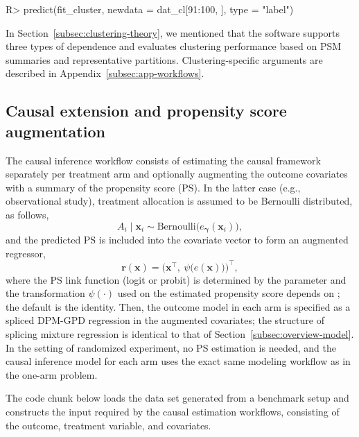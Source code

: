 \documentclass[11pt]{article}\usepackage[]{graphicx}\usepackage[]{xcolor}
\newcommand{\code}[1]{\texttt{\detokenize{#1}}}
\renewenvironment{Schunk}{\vspace{0pt}}{\vspace{-0.1\baselineskip}}
\begin{document}
\begin{Schunk}
\begin{Sinput}
R> predict(fit_cluster, newdata = dat_cl[91:100, ], type = "label")
\end{Sinput}
\end{Schunk}

In Section~\ref{subsec:clustering-theory}, we mentioned that the software supports three types of dependence and evaluates clustering performance based on PSM summaries and representative partitions.
Clustering-specific arguments are described in Appendix~\ref{subsec:app-workflows}.



\subsection{Causal extension and propensity score augmentation}
\label{subsec:overview-causal}

The causal inference workflow consists of estimating the causal
framework separately per treatment arm and optionally augmenting the
outcome covariates with a summary of the propensity score (PS). In the
latter case (e.g., observational study), treatment allocation is
assumed to be Bernoulli distributed, as follows,
\begin{equation*}
A_i \mid \boldsymbol{x}_i \sim \mathrm{Bernoulli}\big(e_{\boldsymbol{\gamma}}(\boldsymbol{x}_i)\big),
\end{equation*}
and the predicted PS is included into the covariate vector to form an
augmented regressor,
\begin{equation*}
\boldsymbol{r}(\boldsymbol{x}) = \big(\boldsymbol{x}^\top,\ \psi\big(\widehat e(\boldsymbol{x})\big)\big)^\top,
\end{equation*}
where the PS link function (logit or probit) is determined by the
\code{PS} parameter and the transformation $\psi(\cdot)$ used on the
estimated propensity score depends on \code{ps\_scale}; the default
is the identity. Then, the outcome model in each arm is specified as
a spliced DPM-GPD regression in the augmented covariates; the
structure of splicing mixture regression is identical to that of
Section~\ref{subsec:overview-model}. In the setting of randomized
experiment, no PS estimation is needed, and the causal inference model
for each arm uses the exact same modeling workflow as in the
one-arm problem.

The code chunk below loads the data set generated from a benchmark
setup and constructs the input \code{data.frame} required by the
causal estimation workflows, consisting of the outcome, treatment
variable, and covariates.
\end{document}
